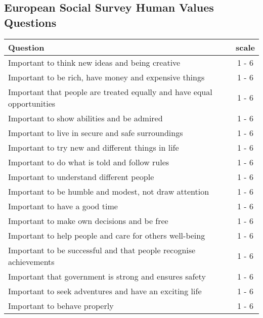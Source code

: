 \begin{table*}[p]
\section{European Social Survey Human Values Questions}
\centering
    \begin{tabular}{|p{11.0cm}|c|}
        \hline
        Question                                                                & scale \\ \hline
        Important to think new ideas and being creative                         & 1 - 6 \\ \hline
        Important to be rich, have money and expensive things                   & 1 - 6 \\ \hline
        Important that people are treated equally and have equal opportunities  & 1 - 6 \\ \hline
        Important to show abilities and be admired                              & 1 - 6 \\ \hline
        Important to live in secure and safe surroundings                       & 1 - 6 \\ \hline
        Important to try new and different things in life                       & 1 - 6 \\ \hline
        Important to do what is told and follow rules                           & 1 - 6 \\ \hline
        Important to understand different people                                & 1 - 6 \\ \hline
        Important to be humble and modest, not draw attention                   & 1 - 6 \\ \hline
        Important to have a good time                                           & 1 - 6 \\ \hline
        Important to make own decisions and be free                             & 1 - 6 \\ \hline
        Important to help people and care for others well-being                 & 1 - 6 \\ \hline
        Important to be successful and that people recognise achievements       & 1 - 6 \\ \hline
        Important that government is strong and ensures safety                  & 1 - 6 \\ \hline
        Important to seek adventures and have an exciting life                  & 1 - 6 \\ \hline
        Important to behave properly                                            & 1 - 6 \\ \hline

\end{tabular}
\end{table*}
